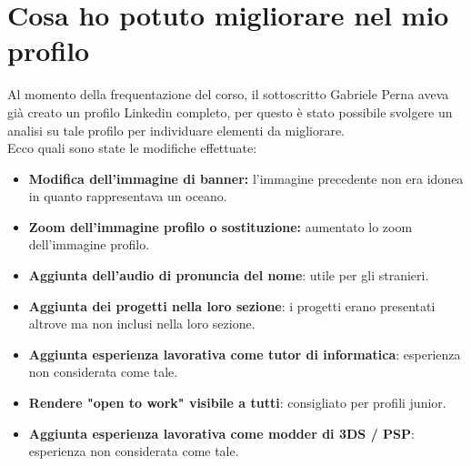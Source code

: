 \documentclass[12pt,a4paper]{article}
\let\oldsection\section
\renewcommand{\section}{\clearpage\oldsection}
\begin{document}
\section{Cosa ho potuto migliorare nel mio profilo}
Al momento della frequentazione del corso, il sottoscritto Gabriele Perna aveva già creato un profilo Linkedin completo, per questo è stato possibile svolgere un analisi su tale profilo per individuare elementi da migliorare.\\
Ecco quali sono state le modifiche effettuate:
\begin{itemize}
    \item \textbf{Modifica dell'immagine di banner:} l'immagine precedente non era idonea in quanto rappresentava un oceano.
    \item \textbf{Zoom dell'immagine profilo o sostituzione:} aumentato lo zoom dell'immagine profilo.
    \item \textbf{Aggiunta dell'audio di pronuncia del nome}: utile per gli stranieri.
    \item \textbf{Aggiunta dei progetti nella loro sezione}: i progetti erano presentati altrove ma non inclusi nella loro sezione.
    \item \textbf{Aggiunta esperienza lavorativa come tutor di informatica}: esperienza non considerata come tale.
    \item \textbf{Rendere "open to work" visibile a tutti}: consigliato per profili junior.
    \item \textbf{Aggiunta esperienza lavorativa come modder di 3DS / PSP}: esperienza non considerata come tale.
\end{itemize}
\end{document}
